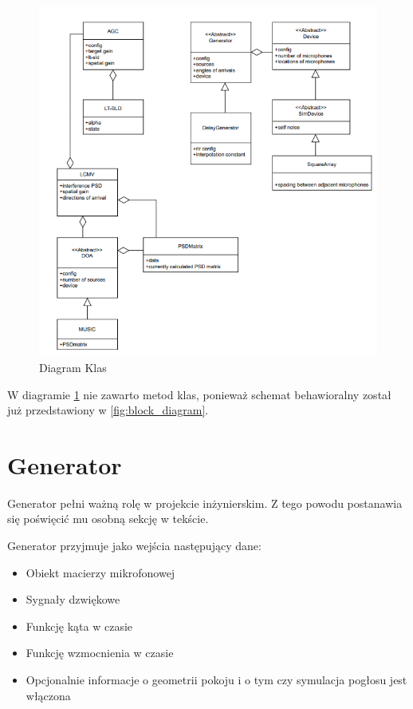 \begin{figure}[h]
    \centering
    \includegraphics[width=\textwidth]{Images/uml.png}
    \caption{Diagram Klas}
    \label{fig:classes}
\end{figure}

\noindent W diagramie \ref{fig:classes} nie zawarto metod klas, ponieważ schemat behawioralny został już przedstawiony w \ref{fig:block_diagram}.

\section{Generator}

Generator pełni ważną rolę w projekcie inżynierskim. Z tego powodu postanawia się poświęcić mu osobną sekcję w tekście. 

\noindent Generator przyjmuje jako wejścia następujący dane:

\begin{itemize}
    \item Obiekt macierzy mikrofonowej
    \item Sygnały dzwiękowe 
    \item Funkcję kąta w czasie
    \item Funkcję wzmocnienia w czasie
    \item Opcjonalnie informacje o geometrii pokoju i o tym czy symulacja pogłosu jest włączona
\end{itemize}

